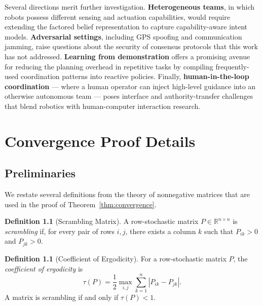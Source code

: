\documentclass[12pt,oneside]{report}
\theoremstyle{definition}
\newtheorem{definition}[theorem]{Definition}
\theoremstyle{remark}
\begin{document}
Several directions merit further investigation. \textbf{Heterogeneous teams},
in which robots possess different sensing and actuation capabilities, would
require extending the factored belief representation to capture capability-aware
intent models. \textbf{Adversarial settings}, including GPS spoofing and
communication jamming, raise questions about the security of consensus protocols
that this work has not addressed. \textbf{Learning from demonstration} offers a
promising avenue for reducing the planning overhead in repetitive tasks by
compiling frequently-used coordination patterns into reactive policies. Finally,
\textbf{human-in-the-loop coordination} --- where a human operator can inject
high-level guidance into an otherwise autonomous team --- poses interface and
authority-transfer challenges that blend robotics with human-computer interaction
research.

\appendix
\chapter{Convergence Proof Details}
\label{app:convergence}

\section{Preliminaries}

We restate several definitions from the theory of nonnegative matrices
\citep{seneta2006nonnegative} that are used in the proof of
Theorem~\ref{thm:convergence}.

\begin{definition}[Scrambling Matrix]
  A row-stochastic matrix $P \in \mathbb{R}^{n \times n}$ is \emph{scrambling} if,
  for every pair of rows $i, j$, there exists a column $k$ such that
  $P_{ik} > 0$ and $P_{jk} > 0$.
\end{definition}

\begin{definition}[Coefficient of Ergodicity]
  For a row-stochastic matrix $P$, the \emph{coefficient of ergodicity} is
  \begin{equation}
    \tau(P) = \frac{1}{2} \max_{i,j} \sum_{k=1}^n |P_{ik} - P_{jk}|.
  \end{equation}
  A matrix is scrambling if and only if $\tau(P) < 1$.
\end{definition}
\end{document}
